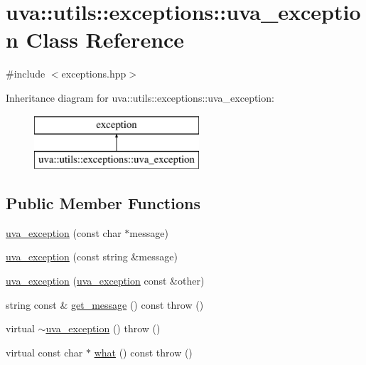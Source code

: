 \hypertarget{classuva_1_1utils_1_1exceptions_1_1uva__exception}{}\section{uva\+:\+:utils\+:\+:exceptions\+:\+:uva\+\_\+exception Class Reference}
\label{classuva_1_1utils_1_1exceptions_1_1uva__exception}


{\ttfamily \#include $<$exceptions.\+hpp$>$}

Inheritance diagram for uva\+:\+:utils\+:\+:exceptions\+:\+:uva\+\_\+exception\+:\begin{figure}[H]
\begin{center}
\leavevmode
\includegraphics[height=2.000000cm]{classuva_1_1utils_1_1exceptions_1_1uva__exception}
\end{center}
\end{figure}
\subsection*{Public Member Functions}
\begin{DoxyCompactItemize}
\item 
\hyperlink{classuva_1_1utils_1_1exceptions_1_1uva__exception_a03defbe6035043210bcc5376880c0e21}{uva\+\_\+exception} (const char $\ast$message)
\item 
\hyperlink{classuva_1_1utils_1_1exceptions_1_1uva__exception_a4309971ffce6c372a55e6fb9dd30886a}{uva\+\_\+exception} (const string \&message)
\item 
\hyperlink{classuva_1_1utils_1_1exceptions_1_1uva__exception_ad161d76a5a99fe45c79c72c4dbcdae49}{uva\+\_\+exception} (\hyperlink{classuva_1_1utils_1_1exceptions_1_1uva__exception}{uva\+\_\+exception} const \&other)
\item 
string const \& \hyperlink{classuva_1_1utils_1_1exceptions_1_1uva__exception_a3a7edd62a730e13484694fc9d7d1c4ed}{get\+\_\+message} () const   throw ()
\item 
virtual \hyperlink{classuva_1_1utils_1_1exceptions_1_1uva__exception_ac79ca9e8ccfce51e17f34381ebd45ffd}{$\sim$uva\+\_\+exception} ()  throw ()
\item 
virtual const char $\ast$ \hyperlink{classuva_1_1utils_1_1exceptions_1_1uva__exception_a40f5f6bee8b06d8e6eb7c0cec27e65b1}{what} () const   throw ()
\end{DoxyCompactItemize}


